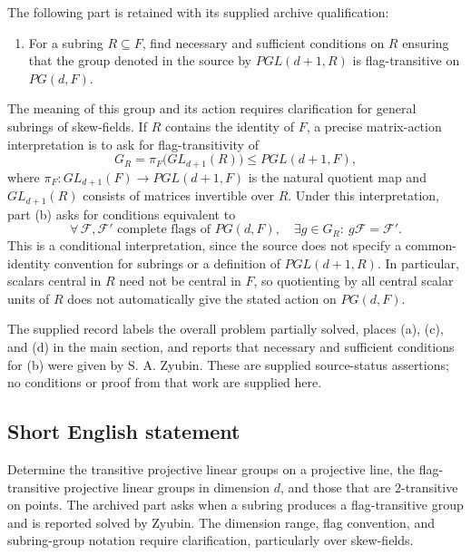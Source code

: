 \documentclass[11pt]{article}
\begin{document}
The following part is retained with its supplied archive qualification:
\begin{enumerate}
\item[(b)] For a subring \(R\subseteq F\), find necessary and sufficient conditions on \(R\) ensuring that the group denoted in the source by \(PGL(d+1,R)\) is flag-transitive on \(PG(d,F)\).
\end{enumerate}
The meaning of this group and its action requires clarification for general subrings of skew-fields. If \(R\) contains the identity of \(F\), a precise matrix-action interpretation is to ask for flag-transitivity of
\[
G_R=\pi_F\bigl(GL_{d+1}(R)\bigr)\leq PGL(d+1,F),
\]
where \(\pi_F:GL_{d+1}(F)\to PGL(d+1,F)\) is the natural quotient map and \(GL_{d+1}(R)\) consists of matrices invertible over \(R\). Under this interpretation, part (b) asks for conditions equivalent to
\[
\forall\,\mathcal F,\mathcal F'\text{ complete flags of }PG(d,F),
\quad \exists g\in G_R:\ g\mathcal F=\mathcal F'.
\]
This is a conditional interpretation, since the source does not specify a common-identity convention for subrings or a definition of \(PGL(d+1,R)\). In particular, scalars central in \(R\) need not be central in \(F\), so quotienting by all central scalar units of \(R\) does not automatically give the stated action on \(PG(d,F)\).

The supplied record labels the overall problem partially solved, places (a), (c), and (d) in the main section, and reports that necessary and sufficient conditions for (b) were given by S. A. Zyubin. These are supplied source-status assertions; no conditions or proof from that work are supplied here.
\subsection{Short English statement}
Determine the transitive projective linear groups on a projective line, the flag-transitive projective linear groups in dimension \(d\), and those that are \(2\)-transitive on points. The archived part asks when a subring produces a flag-transitive group and is reported solved by Zyubin. The dimension range, flag convention, and subring-group notation require clarification, particularly over skew-fields.
\end{document}
